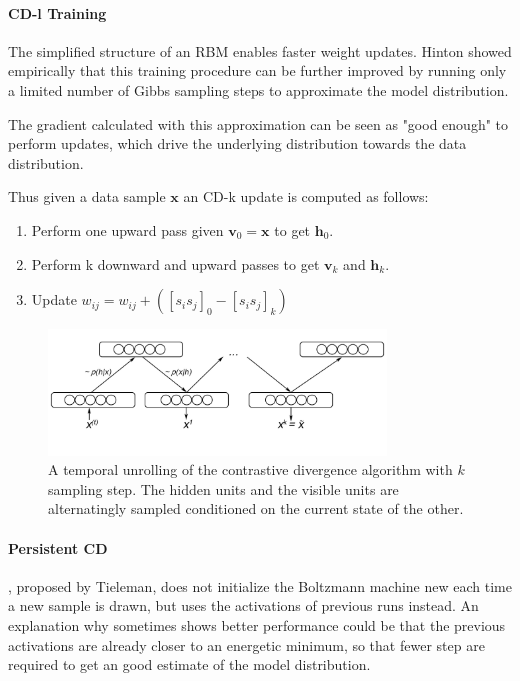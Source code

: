 \paragraph{CD-l Training}

The simplified structure of an RBM enables faster weight updates. 
Hinton showed empirically that this training procedure can be further improved by running only a limited number of Gibbs sampling steps to approximate the model distribution.

The gradient calculated with this approximation can be seen as "good enough" to perform updates, which drive the underlying distribution towards the data distribution.

Thus given a data sample $\textbf{x}$ an CD-k update is computed as follows:
\begin{enumerate}
\item Perform one upward pass given $\textbf{v}_0=\textbf{x}$ to get $\textbf{h}_0$.
\item Perform k downward and upward passes to get $\textbf{v}_k$ and $\textbf{h}_k$.
\item Update $w_{ij} = w_{ij} + ( [s_i s_j]_0 - [s_i s_j]_k ) $ 
\end{enumerate} 

\begin{figure}
	\centering
    	\includegraphics[width=0.8\textwidth]{imgs/cd.png} 
    \caption{A temporal unrolling of the contrastive divergence algorithm with $k$ sampling step. The hidden units and the visible units are alternatingly sampled conditioned on the current state of the other.}
	\label{fig:cd}
\end{figure}

\paragraph{Persistent CD}

, proposed by Tieleman, does not initialize the Boltzmann machine new each time a new sample is drawn, but uses the activations of previous runs instead. An explanation why sometimes shows better performance could be that the previous activations are already closer to an energetic minimum, so that fewer step are required to get an good estimate of the model distribution. 


